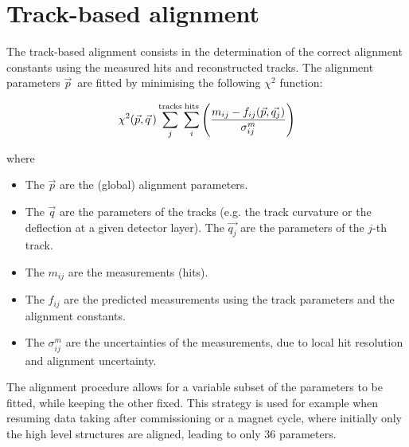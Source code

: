 \section{Track-based alignment}
The track-based alignment consists in the determination of the correct alignment constants using the measured hits and reconstructed tracks.
The alignment parameters $\vec{p}\,$ are fitted by minimising the following $\chi^2$ function:

\begin{equation}
  \chi^2(\vec{p}, \vec{q}\,) \sum_j^{\rm tracks} \sum_i^{\rm hits} \left( \frac{m_{ij} - f_{ij}(\vec{p}, \vec{q_j})}{\sigma_{ij}^{m}} \right)
\end{equation}

where
\begin{itemize}
  \item The $\vec{p}$ are the (global) alignment parameters.
  \item The $\vec{q}$ are the parameters of the tracks (e.g. the track curvature or the deflection at a given detector layer).
    The $\vec{q_j}$ are the parameters of the $j$-th track.
  \item The $m_{ij}$ are the measurements (hits).
  \item The $f_{ij}$ are the predicted measurements using the track parameters and the alignment constants.
  \item The $\sigma^m_{ij}$ are the uncertainties of the measurements, due to local hit resolution and alignment uncertainty.
\end{itemize}

The alignment procedure allows for a variable subset of the parameters to be fitted, while keeping the other fixed.
This strategy is used for example when resuming data taking after commissioning or a magnet cycle, where initially only the high level structures are aligned,
leading to only 36 parameters.

